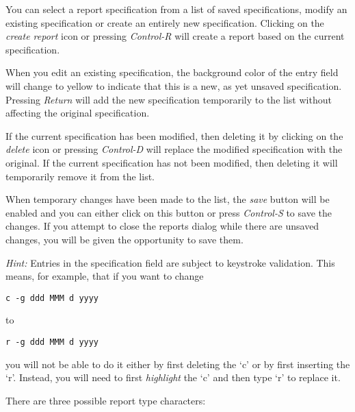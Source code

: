 \documentclass[]{article}
\begin{document}
You can select a report specification from a list of saved
specifications, modify an existing specification or create an entirely
new specification. Clicking on the \emph{create report} icon or pressing
\emph{Control-R} will create a report based on the current
specification.

When you edit an existing specification, the background color of the
entry field will change to yellow to indicate that this is a new, as yet
unsaved specification. Pressing \emph{Return} will add the new
specification temporarily to the list without affecting the original
specification.

If the current specification has been modified, then deleting it by
clicking on the \emph{delete} icon or pressing \emph{Control-D} will
replace the modified specification with the original. If the current
specification has not been modified, then deleting it will temporarily
remove it from the list.

When temporary changes have been made to the list, the \emph{save}
button will be enabled and you can either click on this button or press
\emph{Control-S} to save the changes. If you attempt to close the
reports dialog while there are unsaved changes, you will be given the
opportunity to save them.

\emph{Hint:} Entries in the specification field are subject to keystroke
validation. This means, for example, that if you want to change

\begin{verbatim}
c -g ddd MMM d yyyy
\end{verbatim}

to

\begin{verbatim}
r -g ddd MMM d yyyy
\end{verbatim}

you will not be able to do it either by first deleting the `c' or by
first inserting the `r'. Instead, you will need to first
\emph{highlight} the `c' and then type `r' to replace it.

There are three possible report type characters:
\end{document}
